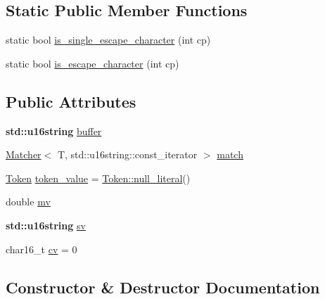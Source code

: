 \subsection*{Static Public Member Functions}
\begin{DoxyCompactItemize}
\item 
static bool \hyperlink{class_lexical_grammar_a1648e4991fdcbb71709e73924171a92c}{is\+\_\+single\+\_\+escape\+\_\+character} (int cp)
\item 
static bool \hyperlink{class_lexical_grammar_a6c6aad40b7a73bc8e431906738311d66}{is\+\_\+escape\+\_\+character} (int cp)
\end{DoxyCompactItemize}
\subsection*{Public Attributes}
\begin{DoxyCompactItemize}
\item 
\textbf{ std\+::u16string} \hyperlink{class_lexical_grammar_af23cc1b7472da117c7e39a8b8fe45e04}{buffer}
\item 
\hyperlink{class_matcher}{Matcher}$<$ T, std\+::u16string\+::const\+\_\+iterator $>$ \hyperlink{class_lexical_grammar_a868dc475274f55ff285fd26593f9d0a5}{match}
\item 
\hyperlink{class_token}{Token} \hyperlink{class_lexical_grammar_a3230ebef29d379b7b4c276e2a771edc4}{token\+\_\+value} = \hyperlink{class_token_af892768a64f034c6d941281fd7d6b758}{Token\+::null\+\_\+literal}()
\item 
double \hyperlink{class_lexical_grammar_a9e73d081df33b375d2f6e75e1569a31b}{mv}
\item 
\textbf{ std\+::u16string} \hyperlink{class_lexical_grammar_adb7fa78005ee277768cde788efb7a667}{sv}
\item 
char16\+\_\+t \hyperlink{class_lexical_grammar_ad579d5598245aa0ed816102edad07507}{cv} = 0
\end{DoxyCompactItemize}


\subsection{Constructor \& Destructor Documentation}
\mbox{\label{class_lexical_grammar_ae00a07b2f2c282a59d8df82c0596cc04}} 
